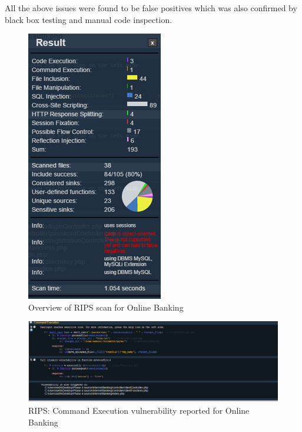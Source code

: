 All the above issues were found to be false positives which was also confirmed by black box testing and manual code inspection.

\begin{figure}[ht]
	\centering
	\includegraphics[width=.8\linewidth]{figures/rips_overview.png}
	\caption{Overview of RIPS scan for Online Banking}
	\label{fig:rips_overview}
\end{figure}

\begin{figure}[ht]
	\centering
	\includegraphics[width=.8\linewidth]{figures/rips_command_execution.png}
	\caption{RIPS: Command Execution vulnerability reported for Online Banking}
	\label{fig:rips_command_execution}
\end{figure}

